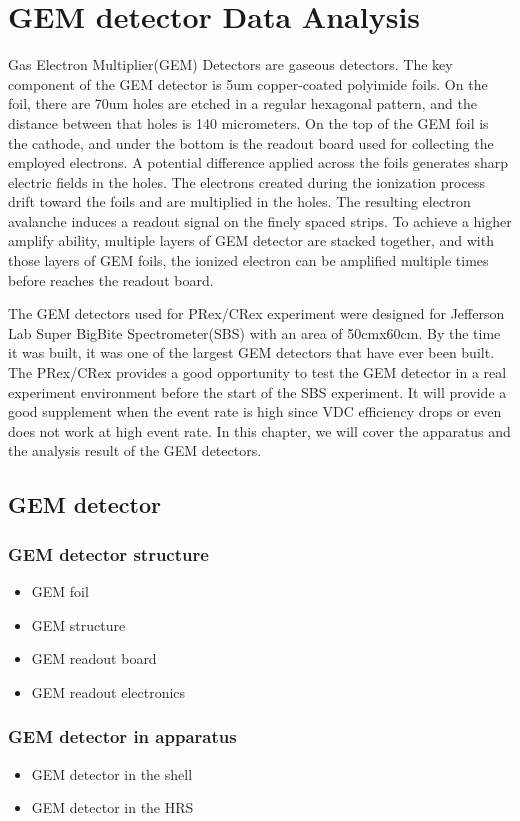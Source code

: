 \chapter{GEM detector Data Analysis}

Gas Electron Multiplier(GEM) Detectors are gaseous detectors. The key component of the GEM detector is 5um copper-coated polyimide foils. On the foil, there are 70um holes are etched in a regular hexagonal pattern, and the distance between that holes is 140 micrometers. On the top of the GEM foil is the cathode, and under the bottom is the readout board used for collecting the employed electrons. A potential difference applied across the foils generates sharp electric fields in the holes. The electrons created during the ionization process drift toward the foils and are multiplied in the holes. The resulting electron avalanche induces a readout signal on the finely spaced strips. To achieve a higher amplify ability, multiple layers of GEM detector are stacked together, and with those layers of GEM foils, the ionized electron can be amplified multiple times before reaches the readout board. 

The GEM detectors used for PRex/CRex experiment were designed for Jefferson Lab Super BigBite Spectrometer(SBS) with an area of 50cmx60cm. By the time it was built, it was one of the largest GEM detectors that have ever been built. The PRex/CRex provides a good opportunity to test the GEM detector in a real experiment environment before the start of the SBS experiment. It will provide a good supplement when the event rate is high since VDC efficiency drops or even does not work at high event rate.  In this chapter, we will cover the apparatus and the analysis result of the GEM detectors. 


\section{GEM detector}
\subsection{GEM detector structure}
\begin{itemize}
    \item GEM foil
    \item GEM structure 
    \item GEM readout board
    \item GEM readout electronics
\end{itemize}
\subsection{GEM detector in apparatus}
\begin{itemize}
    \item GEM detector in the shell
    \item GEM detector in the HRS
\end{itemize}
